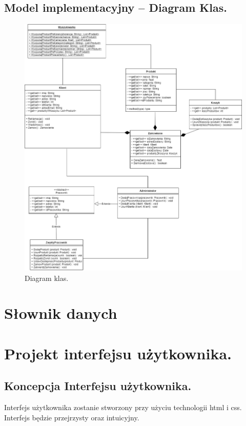 \documentclass[a4paper,11pt]{article}
\begin{document}
\subsection {Model implementacyjny – Diagram Klas.}
\begin{figure}[H]
	\centering
		\includegraphics[width=1\textwidth]{Diagramy/DFD0-Diagram-UML.png}
	\caption{Diagram klas.}
\end{figure}

\section {Słownik danych}


\section {Projekt interfejsu użytkownika.}
\subsection {Koncepcja Interfejsu użytkownika.}
Interfejs użytkownika zostanie stworzony przy użyciu technologii html i css. Interfejs będzie przejrzysty oraz intuicyjny. 
\end{document}
